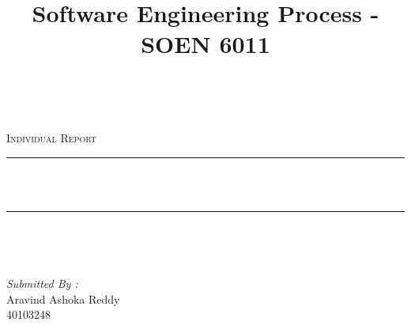 \documentclass[12pt]{report}
\title{Software Engineering Process - SOEN 6011}
\author{ }
\date{}
\makeatletter
\let\thetitle\@title
\makeatother
\begin{document}

\begin{titlepage}
\centering
    \vspace*{0.5 cm}
\begin{center}    \textsc{\Large   }\\[2.0 cm]	\end{center}%
\textsc{\Large Individual Report  }\\[0.5 cm]	%
\rule{\linewidth}{0.2 mm} \\[0.4 cm]
{ \huge \bfseries \thetitle}\\
\rule{\linewidth}{0.2 mm} \\[1.5 cm]

\begin{minipage}{0.4\textwidth}
\begin{center} \large
\end{center}
\end{minipage}~
\begin{center}{}
            
\begin{center} \large
\emph{Submitted By :} \\
Aravind Ashoka Reddy  \\
40103248 \\

\end{center}
           
\end{center}\\[2 cm]


    
    
    
    

\end{titlepage}


\tableofcontents
\pagebreak

\renewcommand{\thesection}{\arabic{section}}
\end{document}
